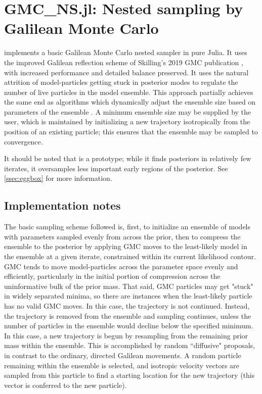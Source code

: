 \chapter{GMC\_NS.jl: Nested sampling by Galilean Monte Carlo}
\label{chap:GMC}
 implements a basic Galilean Monte Carlo nested sampler \cite{Skilling2012,Skilling2019} in pure Julia. It uses the improved Galilean reflection scheme of Skilling's 2019 GMC publication \cite{Skilling2019}, with increased performance and detailed balance preserved. It uses the natural attrition of model-particles getting stuck in posterior modes to regulate the number of live particles in the model ensemble. This approach partially achieves the same end as algorithms which dynamically adjust the ensemble size based on parameters of the ensemble \cite{Feroz2009,Higson2019}. A minimum ensemble size may be supplied by the user, which is maintained by initializing a new trajectory isotropically from the position of an existing particle; this ensures that the ensemble may be sampled to convergence.

It should be noted that  is a prototype; while it finds posteriors in relatively few iterates, it oversamples less important early regions of the posterior. See \autoref{ssec:eggbox} for more information.

\section{Implementation notes}

The basic sampling scheme followed is, first, to initialize an ensemble of models with parameters sampled evenly from across the prior, then to compress the ensemble to the posterior by applying GMC moves to the least-likely model in the ensemble at a given iterate, constrained within its current likelihood contour. GMC tends to move model-particles across the parameter space evenly and efficiently, particularly in the initial portion of compression across the uninformative bulk of the prior mass. That said, GMC particles may get "stuck" in widely separated minima, so there are instances when the least-likely particle has no valid GMC moves. In this case, the trajectory is not continued. Instead, the trajectory is removed from the ensemble and sampling continues, unless the number of particles in the ensemble would decline below the specified minimum. In this case, a new trajectory is begun by resampling from the remaining prior mass within the ensemble. This is accomplished by random ``diffusive" proposals, in contrast to the ordinary, directed Galilean movements. A random particle remaining within the ensemble is selected, and isotropic velocity vectors are sampled from this particle to find a starting location for the new trajectory (this vector is conferred to the new particle).

